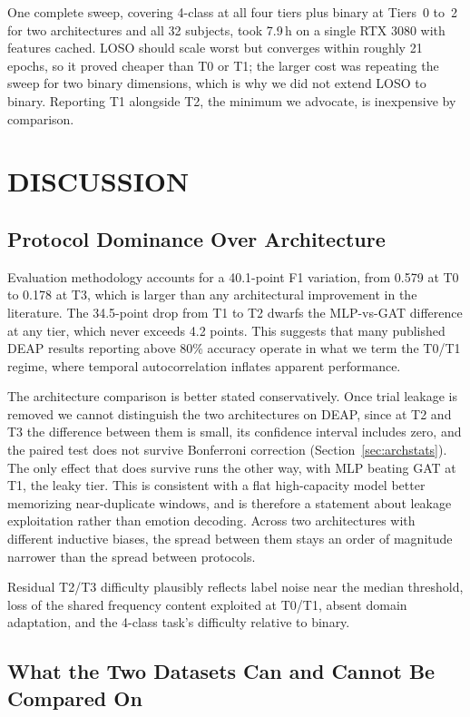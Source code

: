 \documentclass[conference,a4paper]{IEEEtran}
\begin{document}
One complete sweep, covering 4-class at all four tiers plus binary at Tiers~0 to~2 for two architectures and all 32 subjects, took 7.9\,h on a single RTX 3080 with features cached. LOSO should scale worst but converges within roughly 21 epochs, so it proved cheaper than T0 or T1; the larger cost was repeating the sweep for two binary dimensions, which is why we did not extend LOSO to binary. Reporting T1 alongside T2, the minimum we advocate, is inexpensive by comparison.

\section{DISCUSSION}

\subsection{Protocol Dominance Over Architecture}

Evaluation methodology accounts for a 40.1-point F1 variation, from 0.579 at T0 to 0.178 at T3, which is larger than any architectural improvement in the literature. The 34.5-point drop from T1 to T2 dwarfs the MLP-vs-GAT difference at any tier, which never exceeds 4.2 points. This suggests that many published DEAP results reporting above 80\% accuracy operate in what we term the T0/T1 regime, where temporal autocorrelation inflates apparent performance.

The architecture comparison is better stated conservatively. Once trial leakage is removed we cannot distinguish the two architectures on DEAP, since at T2 and T3 the difference between them is small, its confidence interval includes zero, and the paired test does not survive Bonferroni correction (Section~\ref{sec:archstats}). The only effect that does survive runs the other way, with MLP beating GAT at T1, the leaky tier. This is consistent with a flat high-capacity model better memorizing near-duplicate windows, and is therefore a statement about leakage exploitation rather than emotion decoding. Across two architectures with different inductive biases, the spread between them stays an order of magnitude narrower than the spread between protocols.

Residual T2/T3 difficulty plausibly reflects label noise near the median threshold, loss of the shared frequency content exploited at T0/T1, absent domain adaptation, and the 4-class task's difficulty relative to binary.

\subsection{What the Two Datasets Can and Cannot Be Compared On}
\end{document}
